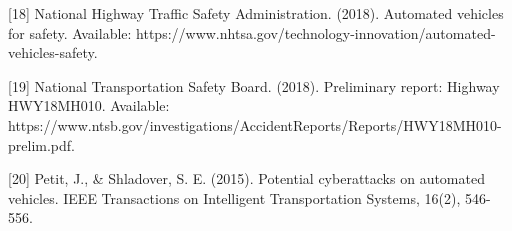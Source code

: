 \documentclass[zihao=-4]{ctexart}
\begin{document}
[18] National Highway Traffic Safety Administration. (2018). Automated vehicles for safety. Available: https://www.nhtsa.gov/technology-innovation/automated-vehicles-safety.

[19] National Transportation Safety Board. (2018). Preliminary report: Highway HWY18MH010. Available: https://www.ntsb.gov/investigations/AccidentReports/Reports/HWY18MH010-prelim.pdf.

[20] Petit, J., \& Shladover, S. E. (2015). Potential cyberattacks on automated vehicles. IEEE Transactions on Intelligent Transportation Systems, 16(2), 546-556. 

% 
\end{document}
